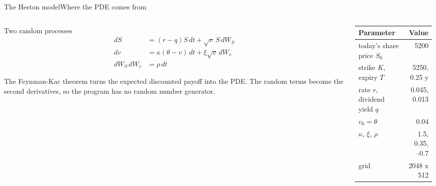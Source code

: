 \documentclass[aspectratio=169,11pt]{beamer}
\newcommand{\sigtable}[3]{%
  \begingroup
  \renewcommand{\arraystretch}{1.12}%
  \begin{table}\small
    \begin{tabular}{#1}
      \toprule
      #2 \\
      \midrule
      #3
      \bottomrule
    \end{tabular}
  \end{table}%
  \endgroup
}
\begin{document}
\begin{frame}{The Heston model}{Where the PDE comes from}
  \begin{columns}[T,onlytextwidth]
    \begin{column}{0.52\textwidth}
      \begin{block}{Two random processes}
        \vspace{-0.6em}
        \begin{align*}
          dS &= (r - q) S\,dt + \sqrt{v}\, S\, dW_S \\
          dv &= \kappa (\theta - v)\,dt + \xi \sqrt{v}\, dW_v \\
          dW_S\, dW_v &= \rho\, dt
        \end{align*}
        \vspace{-1.2em}
      \end{block}
      {\small The Feynman-Kac theorem turns the expected discounted payoff
      into the PDE. The random terms become the second derivatives, so the
      program has no random number generator.}
    \end{column}
    \begin{column}{0.44\textwidth}
      \sigtable{lr}{\textbf{Parameter} & \textbf{Value}}{%
        today's share price $S_0$ & 5200 \\
        strike $K$, expiry $T$ & 5250, 0.25 y \\
        rate $r$, dividend yield $q$ & 0.045, 0.013 \\
        $v_0 = \theta$ & 0.04 \\
        $\kappa$, $\xi$, $\rho$ & 1.5, 0.35, -0.7 \\
        grid & 2048 x 512 \\}
    \end{column}
  \end{columns}
\end{frame}
\end{document}
